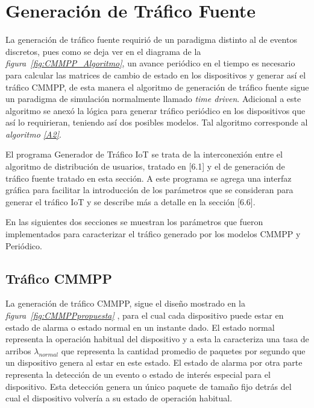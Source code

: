 \hfill

\break


\section{Generación de Tráfico Fuente}
La generación de tráfico fuente requirió de un paradigma distinto al de eventos discretos, pues como se deja ver en el diagrama de la \textit{figura~\ref{fig:CMMPP_Algoritmo}}, un avance periódico en el tiempo es necesario para calcular las matrices de cambio de estado en los dispositivos y generar así el tráfico CMMPP, de esta manera el algoritmo de generación de tráfico fuente sigue un paradigma de simulación normalmente llamado \textit{time driven}. Adicional a este algoritmo se anexó la lógica para generar tráfico periódico en los dispositivos que así lo requirieran, teniendo así dos posibles modelos. Tal algoritmo corresponde al \textit{algoritmo \ref{A2}}. \newline

El programa Generador de Tráfico IoT se trata de la interconexión entre el algoritmo de distribución de usuarios, tratado en [6.1] y el de generación de tráfico fuente tratado en esta sección. A este programa se agrega una interfaz gráfica para facilitar la introducción de los parámetros que se consideran para generar el tráfico IoT y  se  describe más a detalle en la sección [6.6]. \newline

En las siguientes dos secciones se muestran los parámetros que fueron implementados para caracterizar el tráfico generado por los modelos CMMPP y Periódico. \newline
\subsection{Tráfico CMMPP}
La generación de tráfico CMMPP, sigue el diseño mostrado en la \textit{figura~\ref{fig:CMMPPpropuesta}} , para el cual cada dispositivo puede estar en estado de alarma o estado normal en un instante dado. El estado normal representa la operación habitual del dispositivo y a esta la caracteriza una tasa de arribos $ \lambda_{normal}$ que representa la cantidad promedio de paquetes por segundo que un dispositivo genera al estar en este estado. El estado de alarma por otra parte representa la detección de un evento o estado de interés especial para el dispositivo. Esta detección genera un único paquete de tamaño fijo detrás del cual el dispositivo volvería a su estado de operación habitual.\newline

